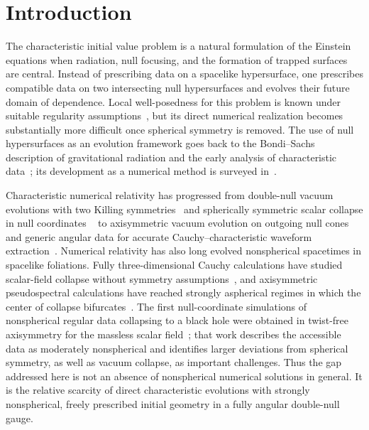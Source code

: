 \section{Introduction}

The characteristic initial value problem is a natural formulation of the
Einstein equations when radiation, null focusing, and the formation of
trapped surfaces are central.  Instead of prescribing data on a spacelike
hypersurface, one prescribes compatible data on two intersecting null
hypersurfaces and evolves their future domain of dependence.  Local
well-posedness for this problem is known under suitable regularity
assumptions~\cite{rendall-90,luk-12,cabet-16,hilditch-20}, but its direct
numerical realization becomes substantially more difficult once spherical
symmetry is removed.  The use of null hypersurfaces as an evolution framework
goes back to the Bondi--Sachs description of gravitational radiation and the
early analysis of characteristic data~\cite{bondi-62,sachs-civp-62}; its
development as a numerical method is surveyed in~\cite{winicour-12}.

Characteristic numerical relativity has progressed from double-null vacuum
evolutions with two Killing symmetries~\cite{corkill-stewart-83} and
spherically symmetric scalar collapse in null coordinates
~\cite{garfinkle-95,hamade-stewart-96} to axisymmetric vacuum evolution on
outgoing null cones~\cite{gomez-94} and generic angular data for accurate
Cauchy--characteristic waveform extraction~\cite{moxon-23}.  Numerical
relativity has also long evolved nonspherical spacetimes in spacelike
foliations.  Fully three-dimensional Cauchy calculations have studied
scalar-field collapse without symmetry assumptions~\cite{deppe-19}, and
axisymmetric pseudospectral calculations have reached strongly aspherical
regimes in which the center of collapse bifurcates~\cite{marouda-24}.  The
first null-coordinate simulations of nonspherical regular data collapsing
to a black hole were obtained in twist-free axisymmetry for the massless
scalar field~\cite{gundlach-24}; that work describes the accessible data as
moderately nonspherical and identifies larger deviations from spherical
symmetry, as well as vacuum collapse, as important challenges.  Thus the gap
addressed here is not an absence of nonspherical numerical solutions in
general.  It is the relative scarcity of direct characteristic evolutions
with strongly nonspherical, freely prescribed initial geometry in a fully
angular double-null gauge.

